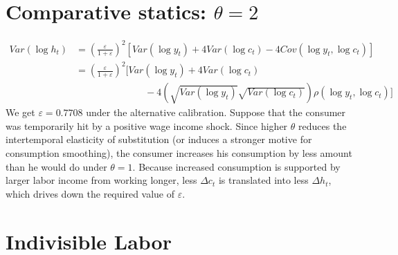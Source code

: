 \documentclass[12pt]{amsart}
\begin{document}
\section{Comparative statics: $\theta = 2$}
\begin{align*}
Var(\log h_t) & = \left( \frac{\varepsilon}{1+ \varepsilon}\right)^2 \left[ Var(\log y_t) +  4 Var(\log c_t) - 4 Cov(\log y_t, \log c_t) \right] \\
& = \left( \frac{\varepsilon}{1+ \varepsilon}\right)^2 \Bigg[ Var(\log y_t) + 4 Var(\log c_t) \\
& \hspace{3cm} - 4 \left( \sqrt{Var(\log y_t)} \sqrt{Var(\log c_t)} \right)\rho(\log y_t, \log c_t) \Bigg]
\end{align*}
We get $\varepsilon = 0.7708$ under the alternative calibration. Suppose that the consumer was temporarily hit by a positive wage income shock. Since higher $\theta$ reduces the intertemporal elasticity of substitution (or induces a stronger motive for consumption smoothing), the consumer increases his consumption by less amount than he would do under $\theta=1$.  Because increased consumption is supported by larger labor income from working longer, less $\Delta c_t$ is translated into less $\Delta h_t$, which drives down the required value of $\varepsilon$. 
\section{Indivisible Labor}
\end{document}
